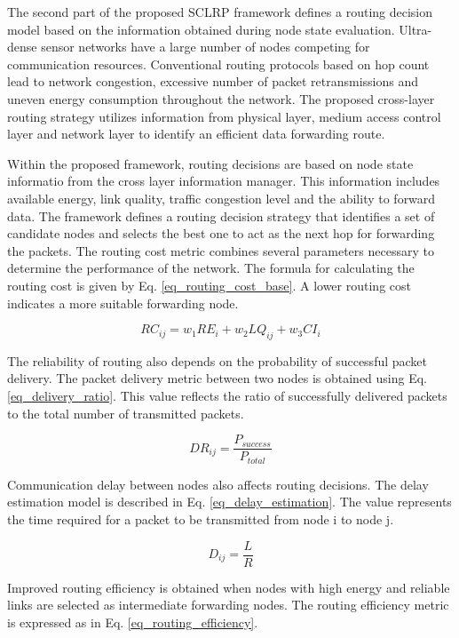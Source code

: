 \documentclass[a4paper,fleqn]{cas-dc}
\numberwithin{equation}{section}
\begin{document}
The second part of the proposed SCLRP framework defines a routing decision model based on the information obtained during node state evaluation. Ultra-dense sensor networks have a large number of nodes competing for communication resources. Conventional routing protocols based on hop count lead to network congestion, excessive number of packet retransmissions and uneven energy consumption throughout the network. The proposed cross-layer routing strategy utilizes information from physical layer, medium access control layer and network layer to identify an efficient data forwarding route.

Within the proposed framework, routing decisions are based on node state informatio from the cross layer information manager. This information includes available energy, link quality, traffic congestion level and the ability to forward data. The framework defines a routing decision strategy that identifies a set of candidate nodes and selects the best one to act as the next hop for forwarding the packets. The routing cost metric combines several parameters necessary to determine the performance of the network. The formula for calculating the routing cost is given by Eq. \ref{eq_routing_cost_base}. A lower routing cost indicates a more suitable forwarding node.

\begin{equation}
RC_{ij} = w_1 RE_i + w_2 LQ_{ij} + w_3 CI_i
\label{eq_routing_cost_base}
\end{equation}

The reliability of routing also depends on the probability of successful packet delivery. The packet delivery metric between two nodes is obtained using Eq. \ref{eq_delivery_ratio}. This value reflects the ratio of successfully delivered packets to the total number of transmitted packets.

\begin{equation}
DR_{ij} = \frac{P_{success}}{P_{total}}
\label{eq_delivery_ratio}
\end{equation}

Communication delay between nodes also affects routing decisions. The delay estimation model is described in Eq. \ref{eq_delay_estimation}. The value represents the time required for a packet to be transmitted from node i to node j.

\begin{equation}
D_{ij} = \frac{L}{R}
\label{eq_delay_estimation}
\end{equation}

Improved routing efficiency is obtained when nodes with high energy and reliable links are selected as intermediate forwarding nodes. The routing efficiency metric is expressed as in Eq. \ref{eq_routing_efficiency}.
\end{document}
